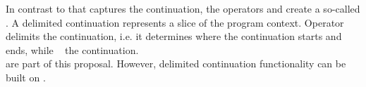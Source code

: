 In contrast to \cc that captures the  continuation, the
operators \shift and \reset create a so-called . A
delimited continuation represents a slice of the program context. Operator
\reset delimits the continuation, i.e. it determines where the continuation
starts and ends, while \shift\  the continuation.\\
 are  part of this proposal. However,
delimited continuation functionality can be built on \cc.

